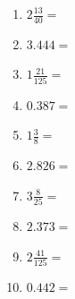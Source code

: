 \documentclass[12pt]{article}
\begin{document}
\begin{enumerate}
\newpage
\item \large $ 2 \frac{13}{40} = $ \vspace{1.5cm}
\item \large $ 3.444 = $ \vspace{1.5cm}
\item \large $ 1 \frac{21}{125} = $ \vspace{1.5cm}
\item \large $ 0.387 = $ \vspace{1.5cm}
\item \large $ 1 \frac{3}{8} = $ \vspace{1.5cm}
\item \large $ 2.826 = $ \vspace{1.5cm}
\item \large $ 3 \frac{8}{25} = $ \vspace{1.5cm}
\item \large $ 2.373 = $ \vspace{1.5cm}
\item \large $ 2 \frac{41}{125} = $ \vspace{1.5cm}
\item \large $ 0.442 = $ \vspace{1.5cm}
\end{enumerate}\newpage
\end{document}
